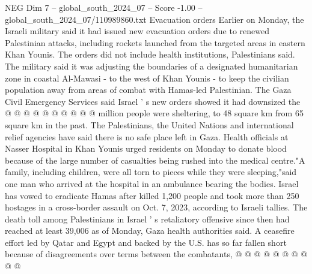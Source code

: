 \begin{textsample}{NEG Dim 7 – global\_south\_2024\_07 – Score -1.00 – global\_south\_2024\_07/110989860.txt}
Evacuation orders Earlier on Monday, the Israeli military said it had issued new evacuation orders due to renewed Palestinian attacks, including rockets launched from the targeted areas in eastern Khan Younis.
The orders did not include health institutions, Palestinians said.
The military said it was adjusting the boundaries of a designated humanitarian zone in coastal Al-Mawasi - to the west of Khan Younis - to keep the civilian population away from areas of combat with Hamas-led Palestinian.
The Gaza Civil Emergency Services said Israel ' s new orders showed it had downsized the @ @ @ @ @ @ @ @ @ @ million people were sheltering, to 48 square km from 65 square km in the past.
The Palestinians, the United Nations and international relief agencies have said there is no safe place left in Gaza.
Health officials at Nasser Hospital in Khan Younis urged residents on Monday to donate blood because of the large number of casualties being rushed into the medical centre."A family, including children, were all torn to pieces while they were sleeping,"said one man who arrived at the hospital in an ambulance bearing the bodies.
Israel has vowed to eradicate Hamas after killed 1,200 people and took more than 250 hostages in a cross-border assault on Oct. 7, 2023, according to Israeli tallies.
The death toll among Palestinians in Israel ' s retaliatory offensive since then had reached at least 39,006 as of Monday, Gaza health authorities said.
A ceasefire effort led by Qatar and Egypt and backed by the U.S. has so far fallen short because of disagreements over terms between the combatants, @ @ @ @ @ @ @ @ @ @

\end{textsample}
